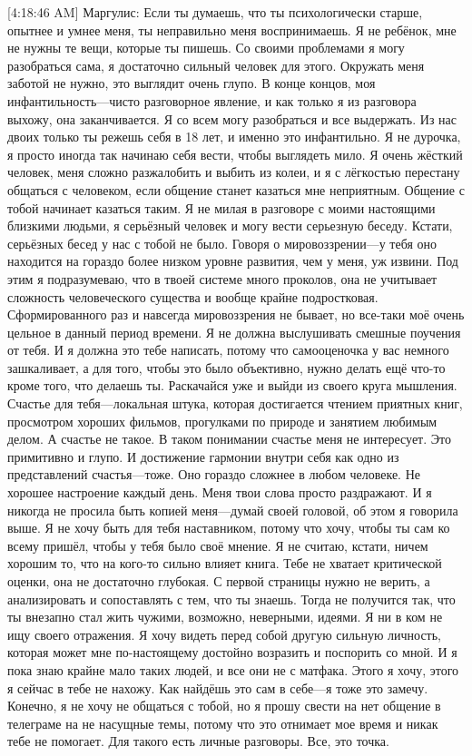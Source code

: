 \documentclass{article}
\begin{document}
[4:18:46 AM] Маргулис:
Если ты думаешь, что ты психологически старше, опытнее и умнее меня, ты неправильно меня воспринимаешь. Я не ребёнок, мне не нужны те вещи, которые ты пишешь. Со своими проблемами я могу разобраться сама, я достаточно сильный человек для этого. Окружать меня заботой не нужно, это выглядит очень глупо. В конце концов, моя инфантильность—чисто разговорное явление, и как только я из разговора выхожу, она заканчивается. Я со всем могу разобраться и все выдержать. Из нас двоих только ты режешь себя в 18 лет, и именно это инфантильно. Я не дурочка, я просто иногда так начинаю себя вести, чтобы выглядеть мило. Я очень жёсткий человек, меня сложно разжалобить и выбить из колеи, и я с лёгкостью перестану общаться с человеком, если общение станет казаться мне неприятным. Общение с тобой начинает казаться таким. Я не милая в разговоре с моими настоящими близкими людьми, я серьёзный человек и могу вести серьезную беседу. Кстати, серьёзных бесед у нас с тобой не было. Говоря о мировоззрении—у тебя оно находится на гораздо более низком уровне развития, чем у меня, уж извини. Под этим я подразумеваю, что в твоей системе много проколов, она не учитывает сложность человеческого существа и вообще крайне подростковая. Сформированного раз и навсегда мировоззрения не бывает, но все-таки моё очень цельное в данный период времени. Я не должна выслушивать смешные поучения от тебя. И я должна это тебе написать, потому что самооценочка у вас немного зашкаливает, а для того, чтобы это было объективно, нужно делать ещё что-то кроме того, что делаешь ты. Раскачайся уже и выйди из своего круга мышления. Счастье для тебя—локальная штука, которая достигается чтением приятных книг, просмотром хороших фильмов, прогулками по природе и занятием любимым делом. А счастье не такое. В таком понимании счастье меня не интересует. Это примитивно и глупо. И достижение гармонии внутри себя как одно из представлений счастья—тоже. Оно гораздо сложнее в любом человеке. Не хорошее настроение каждый день. Меня твои слова просто раздражают. И я никогда не просила быть копией меня—думай своей головой, об этом я говорила выше. Я не хочу быть для тебя наставником, потому что хочу, чтобы ты сам ко всему пришёл, чтобы у тебя было своё мнение. Я не считаю, кстати, ничем хорошим то, что на кого-то сильно влияет книга. Тебе не хватает критической оценки, она не достаточно глубокая. С первой страницы нужно не верить, а анализировать и сопоставлять с тем, что ты знаешь. Тогда не получится так, что ты внезапно стал жить чужими, возможно, неверными, идеями.
 Я ни в ком не ищу своего отражения. Я хочу видеть перед собой другую сильную личность, которая может мне по-настоящему достойно возразить и поспорить со мной. И я пока знаю крайне мало таких людей, и все они не с матфака. Этого я хочу, этого я сейчас в тебе не нахожу. Как найдёшь это сам в себе—я тоже это замечу. Конечно, я не хочу не общаться с тобой, но я прошу свести на нет общение в телеграме на не насущные темы, потому что это отнимает мое время и никак тебе не помогает. Для такого есть личные разговоры. Все, это точка.
\end{document}
